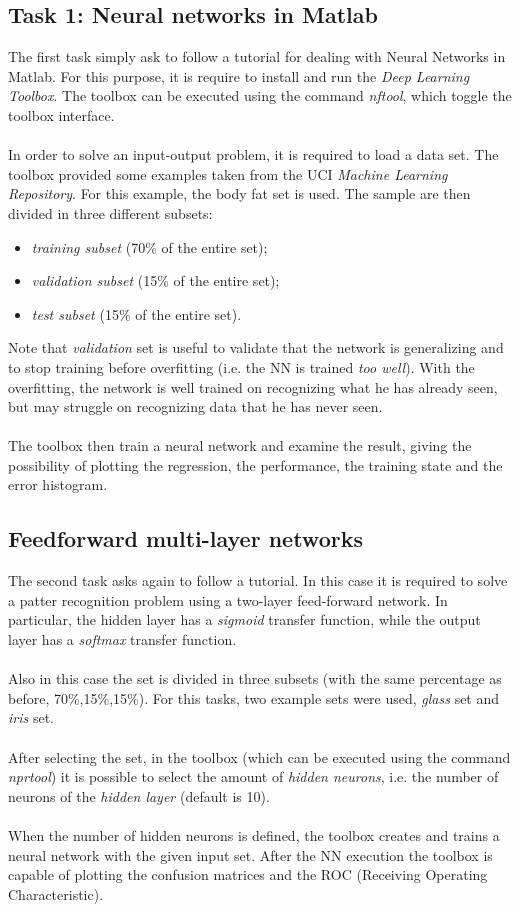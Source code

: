 \documentclass[10pt]{article}
\begin{document}
\subsection{Task 1: Neural networks in Matlab}
The first task simply ask to follow a tutorial for dealing with
Neural Networks in Matlab. For this purpose, it is require to
install and run the \textit{Deep Learning Toolbox}. The toolbox can be executed using the command \textit{nftool}, which toggle the toolbox
interface. 
\\\\
In order to solve an input-output problem, it is required to
load a data set. The toolbox provided some examples taken
from the UCI \textit{Machine Learning Repository}. For this example,
the body fat set is used. The sample are then divided in three
different subsets:
\begin{itemize}
 \item \textit{training subset} (70\% of the entire set);

 \item \textit{validation subset} (15\% of the entire set);
 \item \textit{test subset} (15\% of the entire set).
 \end{itemize} 
 Note that \textit{validation} set is useful to validate that the network
is generalizing and to stop training before overfitting (i.e. the
NN is trained \textit{too well}). With the overfitting, the network is
well trained on recognizing what he has already seen, but may
struggle on recognizing data that he has never seen.
\\\\
The toolbox then train a neural network and examine the
result, giving the possibility of plotting the regression, the
performance, the training state and the error histogram.

\subsection{Feedforward multi-layer networks}
The second task asks again to follow a tutorial. In this case
it is required to solve a patter recognition problem using a
two-layer feed-forward network. In particular, the hidden layer
has a \textit{sigmoid} transfer function, while the output layer has a
\textit{softmax} transfer function.
\\\\
Also in this case the set is divided in three subsets (with
the same percentage as before, 70\%,15\%,15\%). For this tasks,
two example sets were used, \textit{glass} set and \textit{iris} set.
\\\\
After selecting the set, in the toolbox (which can be executed using the command \textit{nprtool}) it is possible to select the
amount of \textit{hidden neurons}, i.e. the number of neurons of the
\textit{hidden layer} (default is 10).
\\\\
When the number of hidden neurons is defined, the toolbox
creates and trains a neural network with the given input set.
After the NN execution the toolbox is capable of plotting
the confusion matrices and the ROC (Receiving Operating
Characteristic).
\end{document}
